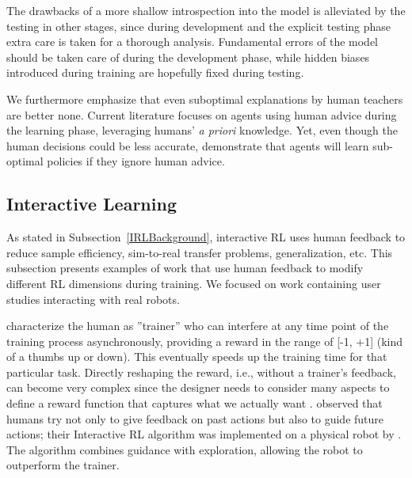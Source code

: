 \documentclass[twoside,11pt]{article}
\begin{document}
The drawbacks of a more shallow introspection into the model is alleviated by the testing in other stages, since during development and the explicit testing phase extra care is taken for a thorough analysis. Fundamental errors of the model should be taken care of during the development phase, while hidden biases introduced during training are hopefully fixed during testing.

We furthermore emphasize that even suboptimal explanations by human teachers are better none. Current literature focuses on agents using human advice during the learning phase, leveraging humans' \emph{a priori} knowledge. Yet, even though the human decisions could be less accurate, \cite{Zhang:2020:human_out_loop} demonstrate that agents will learn sub-optimal policies if they ignore human advice. 
\subsection{Interactive Learning}
As stated in Subsection~\ref{IRLBackground}, interactive RL uses human feedback to reduce sample efficiency, sim-to-real transfer problems, generalization, etc. This subsection presents examples of work that use human feedback to modify different RL dimensions during training. We focused on work containing user studies interacting with real robots.

 \cite{Thomaz:2006:RLWithHumanTeachers} characterize the human as ''trainer'' who can interfere at any time point of the training process asynchronously, providing a reward in the range of [-1, +1] (kind of a thumbs up or down). This eventually speeds up the training time for that particular task. Directly reshaping the reward, i.e., without a trainer's feedback,  can become very complex since the designer needs to consider many aspects to define a reward function that captures what we actually want \citep{hadfield:17}. \cite{Thomaz:2006:RLWithHumanTeachers} observed that humans try not only to give feedback on past actions but also to guide future actions; their Interactive RL algorithm was implemented on a physical robot by \cite{suay:11}. The algorithm combines guidance with exploration, allowing the robot to outperform the trainer. 
\end{document}
